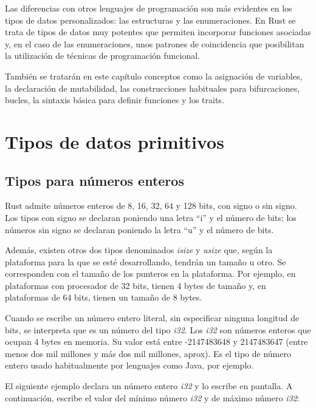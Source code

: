 \begin{Resumen}
Las diferencias con otros lenguajes de programación son más evidentes en los tipos de datos personalizados: las estructuras y las enumeraciones. En Rust se trata de tipos de datos muy potentes que permiten incorporar funciones asociadas y, en el caso de las enumeraciones, unos patrones de coincidencia que posibilitan la utilización de técnicas de programación funcional.

\smallskip

También se tratarán en este capítulo conceptos como la asignación de variables, la declaración de mutabilidad, las construcciones habituales para bifurcaciones, bucles, la sintaxis básica para definir funciones y los traits.
 
\end{Resumen}


\section{Tipos de datos primitivos}

\subsection{Tipos para números enteros}
\label{sec_numeros_enteros}
\noindent Rust admite números enteros de 8, 16, 32, 64 y 128 bits, con signo o sin signo. Los tipos con signo se declaran poniendo una letra ``i'' y el número de bits; los números sin signo se declaran poniendo la letra ``u'' y el número de bits. 

Además, existen otros dos tipos denominados \textit{isize} y \textit{usize} que, según la plataforma para la que se esté desarrollando, tendrán un tamaño u otro. Se corresponden con el tamaño de los punteros en la plataforma. Por ejemplo, en plataformas con procesador de 32 bits, tienen 4 bytes de tamaño y, en plataformas de 64 bits, tienen un tamaño de 8 bytes. 

Cuando se escribe un número entero literal, sin especificar ninguna longitud de bits, se interpreta que es un número del tipo \textit{i32}. Los \textit{i32} son números enteros que ocupan 4 bytes en memoria. Su valor está entre -2147483648 y 2147483647 (entre menos dos mil millones y más dos mil millones, aprox). Es el tipo de número entero usado habitualmente por lenguajes como Java, por ejemplo. 

El siguiente ejemplo declara un número entero \textit{i32} y lo escribe en pantalla. A continuación, escribe el valor del mínimo número \textit{i32} y de máximo número \textit{i32}:

